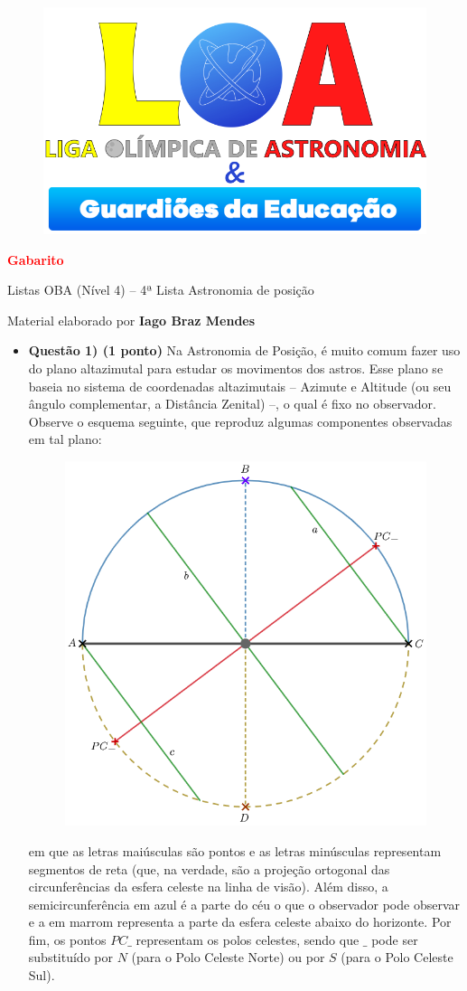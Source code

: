 \documentclass[a4paper, 12pt]{article}
\newcommand{\red}[1]{\textcolor{red}{#1}}
\newcommand{\cabecalho}[4]
{
	\begin{figure}
		\centering
		\href{https://ligaolimpicadeastronomia.com.br/}{\includegraphics[scale=0.6]{./img/logos.png}}
	\end{figure}
	
	\begin{center}
		\begin{large}
			\textbf{#1}	
		\end{large}
			\linebreak Listas OBA (Nível 4) -- #2ª Lista
			\linebreak #3
		\end{center}
	
	\begin{flushright}
		Material elaborado por \textbf{#4}
	\end{flushright}
}
\begin{document}
	\cabecalho{\red{Gabarito}}{4}{Astronomia de posição}{Iago Braz Mendes}
	
	\begin{flushleft}
	\begin{itemize}
		\item \textbf{Questão 1) (1 ponto)} Na Astronomia de Posição, é muito comum fazer uso do plano altazimutal para estudar os movimentos dos astros. Esse plano se baseia no sistema de coordenadas altazimutais -- Azimute e Altitude (ou seu ângulo complementar, a Distância Zenital) --, o qual é fixo no observador. Observe o esquema seguinte, que reproduz algumas componentes observadas em tal plano:
			\begin{figure}[H]
				\centering
				\includegraphics[scale=0.5]{./img/1.png}
			\end{figure}
			em que as letras maiúsculas são pontos e as letras minúsculas representam segmentos de reta (que, na verdade, são a projeção ortogonal das circunferências da esfera celeste na linha de visão). Além disso, a semicircunferência em azul é a parte do céu o que o observador pode observar e a em marrom representa a parte da esfera celeste abaixo do horizonte. Por fim, os pontos $PC\_$ representam os polos celestes, sendo que $\_$ pode ser substituído por $N$ (para o Polo Celeste Norte) ou por $S$ (para o Polo Celeste Sul).
			\begin{itemize}

\end{itemize}
\end{itemize}
\end{flushleft}
\end{document}
